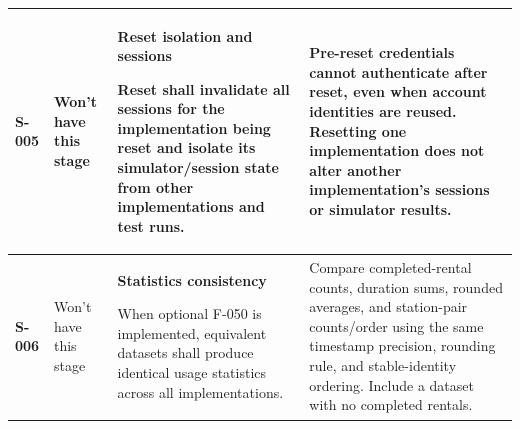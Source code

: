 \documentclass[10pt,a4paper,landscape]{article}
\newcommand{\reqtitle}[1]{{\fontsize{11}{13}\selectfont\bfseries #1}\par\nobreak\vspace{2pt}\noindent}
\begin{document}
\begin{longtable}{|C{27mm}|C{25mm}|L{79mm}|L{111mm}|}
\textbf{S-005} & Won't have this stage & \reqtitle{Reset isolation and sessions}Reset shall invalidate all sessions for the implementation being reset and isolate its simulator/session state from other implementations and test runs. & Pre-reset credentials cannot authenticate after reset, even when account identities are reused. Resetting one implementation does not alter another implementation's sessions or simulator results. \\\hline

\textbf{S-006} & Won't have this stage & \reqtitle{Statistics consistency}When optional F-050 is implemented, equivalent datasets shall produce identical usage statistics across all implementations. & Compare completed-rental counts, duration sums, rounded averages, and station-pair counts/order using the same timestamp precision, rounding rule, and stable-identity ordering. Include a dataset with no completed rentals. \\\hline
\end{longtable}
\endgroup
\end{document}
